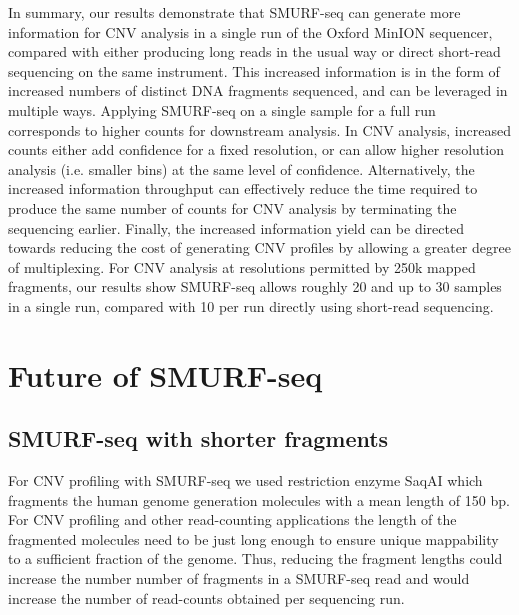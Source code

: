 In summary, our results demonstrate that SMURF-seq can generate more
information for CNV analysis in a single run of the Oxford MinION
sequencer, compared with either producing long reads in the usual way or
direct short-read sequencing on the same instrument.  This increased
information is in the form of increased numbers of distinct DNA
fragments sequenced, and can be leveraged in multiple ways. Applying
SMURF-seq on a single sample for a full run corresponds to higher counts
for downstream analysis. In CNV analysis, increased counts either add
confidence for a fixed resolution, or can allow higher resolution
analysis (i.e. smaller bins) at the same level of confidence.
Alternatively, the increased information throughput can effectively
reduce the time required to produce the same number of counts for CNV
analysis by terminating the sequencing earlier. Finally, the increased
information yield can be directed towards reducing the cost of
generating CNV profiles by allowing a greater degree of multiplexing.
For CNV analysis at resolutions permitted by 250k mapped fragments, our
results show SMURF-seq allows roughly 20 and up to 30 samples in a
single run, compared with 10 per run directly using short-read
sequencing.

\section{Future of SMURF-seq}


\subsection*{SMURF-seq with shorter fragments}
For CNV profiling with SMURF-seq we used restriction enzyme SaqAI which
fragments the human genome generation molecules with a mean length of
150 bp. For CNV profiling and other read-counting applications the
length of the fragmented molecules need to be just long enough to ensure
unique mappability to a sufficient fraction of the genome. Thus,
reducing the fragment lengths could increase the number number of
fragments in a SMURF-seq read and would increase the number of
read-counts obtained per sequencing run.

